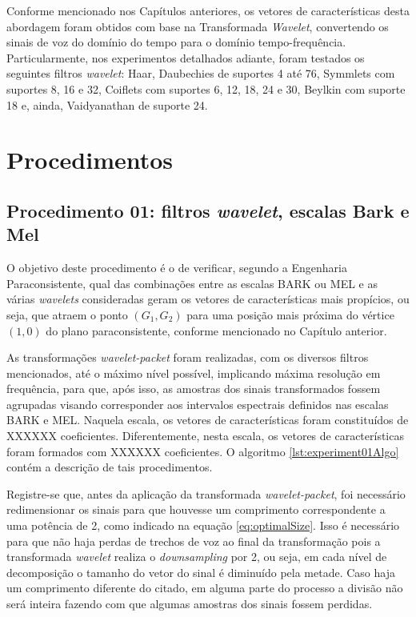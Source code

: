		\par Conforme mencionado nos Capítulos anteriores, os vetores de características desta abordagem foram obtidos com base na Transformada \textit{Wavelet}, convertendo os sinais de voz do domínio do tempo para o domínio tempo-frequência. Particularmente, nos experimentos detalhados adiante, foram testados os seguintes filtros \textit{wavelet}: Haar, Daubechies de suportes 4 até 76, Symmlets com suportes 8, 16 e 32, Coiflets com suportes 6, 12, 18, 24 e 30, Beylkin com suporte 18 e, ainda, Vaidyanathan de suporte 24.

	\section{Procedimentos}
		\subsection{Procedimento 01: filtros \textit{wavelet}, escalas Bark e Mel}
		\label{chap:propApproach:sec:Experimento01}
		\par O objetivo deste procedimento é o de verificar, segundo a Engenharia Paraconsistente, qual das combinações entre as escalas BARK ou MEL e as várias \textit{wavelets} consideradas geram os vetores de características mais propícios, ou seja, que atraem o ponto $(G_1,G_2)$ para uma posição mais próxima do vértice $(1,0)$ do plano paraconsistente, conforme mencionado no Capítulo anterior. 
				
		\par As transformações \textit{wavelet-packet} foram realizadas, com os diversos filtros mencionados, até  o máximo nível possível, implicando máxima resolução em frequência, para que, após isso, as amostras dos sinais transformados fossem agrupadas visando corresponder aos intervalos espectrais definidos nas escalas BARK e MEL. Naquela escala, os vetores de características foram constituídos de XXXXXX coeficientes. Diferentemente, nesta escala, os vetores de características foram formados com XXXXXX coeficientes. O algoritmo \ref{lst:experiment01Algo} contém a descrição de tais procedimentos.
			
		

		\par Registre-se que, antes da aplicação da transformada \textit{wavelet-packet}, foi necessário redimensionar os sinais para que houvesse um comprimento correspondente a uma potência de 2, como indicado na equação \ref{eq:optimalSize}. Isso é necessário para que não haja perdas de trechos de voz ao final da transformação pois a transformada \textit{wavelet} realiza o \textit{downsampling} por 2, ou seja, em cada nível de decomposição o tamanho do vetor do sinal é diminuído pela metade. Caso haja um comprimento diferente do citado, em alguma parte do processo a divisão não será inteira fazendo com que algumas amostras dos sinais fossem perdidas.
				
